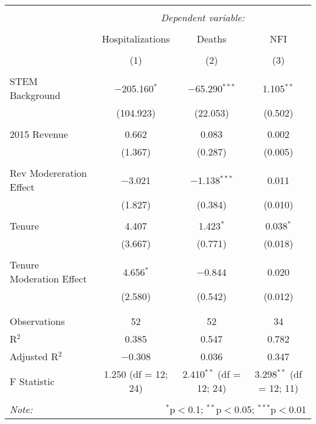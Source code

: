 
\begin{table}[!htbp] \centering 
  \caption{} 
  \label{} 
\begin{tabular}{@{\extracolsep{5pt}}lccc} 
\\[-1.8ex]\hline 
\hline \\[-1.8ex] 
 & \multicolumn{3}{c}{\textit{Dependent variable:}} \\ 
\cline{2-4} 
\\[-1.8ex] & Hospitalizations & Deaths & NFI \\ 
\\[-1.8ex] & (1) & (2) & (3)\\ 
\hline \\[-1.8ex] 
 STEM Background & $-$205.160$^{*}$ & $-$65.290$^{***}$ & 1.105$^{**}$ \\ 
  & (104.923) & (22.053) & (0.502) \\ 
  & & & \\ 
 2015 Revenue & 0.662 & 0.083 & 0.002 \\ 
  & (1.367) & (0.287) & (0.005) \\ 
  & & & \\ 
 Rev Modereration Effect & $-$3.021 & $-$1.138$^{***}$ & 0.011 \\ 
  & (1.827) & (0.384) & (0.010) \\ 
  & & & \\ 
 Tenure & 4.407 & 1.423$^{*}$ & 0.038$^{*}$ \\ 
  & (3.667) & (0.771) & (0.018) \\ 
  & & & \\ 
 Tenure Moderation Effect & 4.656$^{*}$ & $-$0.844 & 0.020 \\ 
  & (2.580) & (0.542) & (0.012) \\ 
  & & & \\ 
\hline \\[-1.8ex] 
Observations & 52 & 52 & 34 \\ 
R$^{2}$ & 0.385 & 0.547 & 0.782 \\ 
Adjusted R$^{2}$ & $-$0.308 & 0.036 & 0.347 \\ 
F Statistic & 1.250 (df = 12; 24) & 2.410$^{**}$ (df = 12; 24) & 3.298$^{**}$ (df = 12; 11) \\ 
\hline 
\hline \\[-1.8ex] 
\textit{Note:}  & \multicolumn{3}{r}{$^{*}$p$<$0.1; $^{**}$p$<$0.05; $^{***}$p$<$0.01} \\ 
\end{tabular} 
\end{table} 
